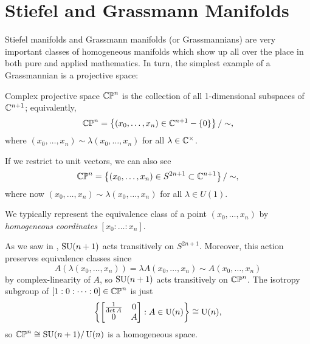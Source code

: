 
\section{Stiefel and Grassmann Manifolds}
\label{sec:stiefel and grassmann}

Stiefel manifolds and Grassmann manifolds (or Grassmannians) are very important classes of homogeneous manifolds which show up all over the place in both pure and applied mathematics. In turn, the simplest example of a Grassmannian is a projective space:

\begin{example}\label{ex:generalized hopf fibration}
	Complex projective space $\mathbb{CP}^n$ is the collection of all 1-dimensional subspaces of $\mathbb{C}^{n+1}$; equivalently,
	\[
		\mathbb{CP}^n = \left\{(x_0, \dots , x_n) \in \mathbb{C}^{n+1} - \{0\}\right\}/\sim,
	\]
	where $(x_0, \dots , x_n) \sim \lambda (x_0, \dots , x_n)$ for all $\lambda \in \mathbb{C}^\times$.
	
	If we restrict to unit vectors, we can also see
	\[
		\mathbb{CP}^n = \left\{(x_0, \dots , x_n) \in S^{2n+1} \subset \mathbb{C}^{n+1}\right\}/\sim,
	\]
	where now $(x_0, \dots , x_n) \sim \lambda (x_0, \dots , x_n)$ for all $\lambda \in U(1)$.
	
	We typically represent the equivalence class of a point $(x_0, \dots , x_n)$ by \emph{homogeneous coordinates} $[x_0 : \dots : x_n]$.
	
	As we saw in , $\operatorname{SU}(n+1)$ acts transitively on $S^{2n+1}$. Moreover, this action preserves equivalence classes since 
	\[
		A(\lambda(x_0, \dots , x_n)) = \lambda A(x_0, \dots , x_n) \sim A(x_0, \dots , x_n)
	\]
	by complex-linearity of $A$, so $\operatorname{SU}(n+1)$ acts transitively on $\mathbb{CP}^n$. The isotropy subgroup of $[1:0: \dots : 0] \in \mathbb{CP}^n$ is just
	\[
		\left\{ \begin{bmatrix} \frac{1}{\det A} & 0 \\ 0 & A \end{bmatrix} : A \in \operatorname{U}(n)\right\} \cong \operatorname{U}(n),
	\]
	so $\mathbb{CP}^n \cong \operatorname{SU}(n+1)/\operatorname{U}(n)$ is a homogeneous space.
	

\end{example}
